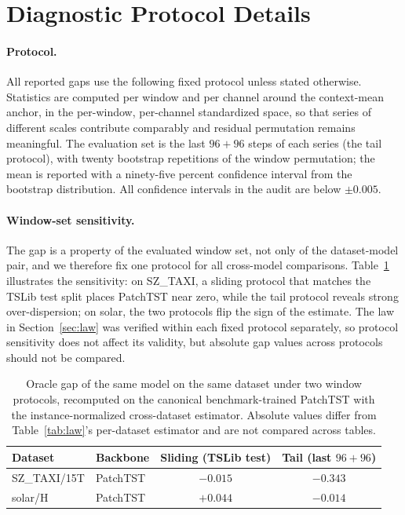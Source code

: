\section{Diagnostic Protocol Details}
\label{app:diagnostic}

\paragraph{Protocol.}
All reported gaps use the following fixed protocol unless stated otherwise. Statistics are computed per window and per channel around the context-mean anchor, in the per-window, per-channel standardized space, so that series of different scales contribute comparably and residual permutation remains meaningful. The evaluation set is the last $96{+}96$ steps of each series (the tail protocol), with twenty bootstrap repetitions of the window permutation; the mean is reported with a ninety-five percent confidence interval from the bootstrap distribution. All confidence intervals in the audit are below $\pm 0.005$.

\paragraph{Window-set sensitivity.}
The gap is a property of the evaluated window set, not only of the dataset-model pair, and we therefore fix one protocol for all cross-model comparisons. Table~\ref{tab:windows} illustrates the sensitivity: on SZ\_TAXI, a sliding protocol that matches the TSLib test split places PatchTST near zero, while the tail protocol reveals strong over-dispersion; on solar, the two protocols flip the sign of the estimate. The law in Section~\ref{sec:law} was verified within each fixed protocol separately, so protocol sensitivity does not affect its validity, but absolute gap values across protocols should not be compared.

\begin{table}[h]
  \small
  \caption{Oracle gap of the same model on the same dataset under two window protocols, recomputed on the canonical benchmark-trained PatchTST with the instance-normalized cross-dataset estimator. Absolute values differ from Table~\ref{tab:law}'s per-dataset estimator and are not compared across tables.}
  \label{tab:windows}
  \centering
  \begin{tabular}{llcc}
    \toprule
    Dataset & Backbone & Sliding (TSLib test) & Tail (last $96{+}96$) \\
    \midrule
    SZ\_TAXI/15T & PatchTST & $-0.015$ & $-0.343$ \\
    solar/H & PatchTST & $+0.044$ & $-0.014$ \\
    \bottomrule
  \end{tabular}
\end{table}

